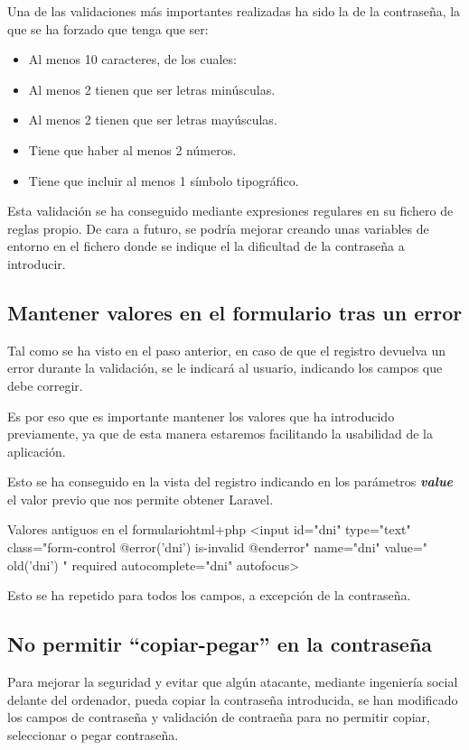 \documentclass{\ClassPath/viu-tfm-template}
\begin{document}
Una de las validaciones más importantes realizadas ha sido la de la contraseña, la que se ha forzado que tenga que ser:

\begin{itemize}
    \item Al menos 10 caracteres, de los cuales:
    \item Al menos 2 tienen que ser letras minúsculas.
    \item Al menos 2 tienen que ser letras mayúsculas.
    \item Tiene que haber al menos 2 números.
    \item Tiene que incluir al menos 1 símbolo tipográfico.
\end{itemize}

Esta validación se ha conseguido mediante expresiones regulares en su fichero de reglas propio. De cara a futuro, se podría mejorar creando unas variables de entorno en el fichero  donde se indique el la dificultad de la contraseña a introducir.

\subsection{Mantener valores en el formulario tras un error}
Tal como se ha visto en el paso anterior, en caso de que el registro devuelva un error durante la validación, se le indicará al usuario, indicando los campos que debe corregir.

Es por eso que es importante mantener los valores que ha introducido previamente, ya que de esta manera estaremos facilitando la usabilidad de la aplicación.

Esto se ha conseguido en la vista del registro indicando en los parámetros \textit{\textbf{value}} el valor previo que nos permite obtener Laravel.


\begin{mycode}{Valores antiguos en el formulario}{html+php}{}
<input id="dni" type="text" class="form-control
    @error('dni') is-invalid @enderror" name="dni"
    value="{{ old('dni') }}"
    required autocomplete="dni" autofocus>
\end{mycode}

Esto se ha repetido para todos los campos, a excepción de la contraseña.

\subsection{No permitir “copiar-pegar” en la contraseña}
Para mejorar la seguridad y evitar que algún atacante, mediante ingeniería social delante del ordenador, pueda copiar la contraseña introducida, se han modificado los campos de contraseña y validación de contraeña para no permitir copiar, seleccionar o pegar contraseña.
\end{document}

